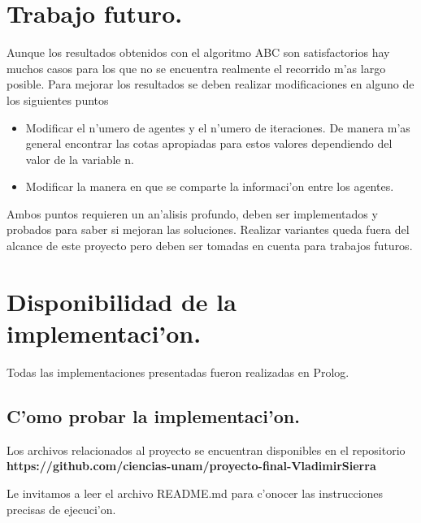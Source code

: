 \documentclass[12pt]{article}
\begin{document}
    \section{Trabajo futuro.}
    Aunque los resultados obtenidos con el algoritmo ABC son satisfactorios
    hay muchos casos para los que no se encuentra realmente el recorrido m'as largo posible.
    Para mejorar los resultados se deben realizar modificaciones en alguno de los siguientes puntos
    \begin{itemize}
        \item Modificar el n'umero de agentes y el n'umero de iteraciones. De manera m'as general
            encontrar las cotas apropiadas para estos
            valores dependiendo del valor de la variable n.
        \item Modificar la manera en que se comparte la informaci'on entre los agentes.
    \end{itemize}

    Ambos puntos requieren un an'alisis profundo, deben ser implementados y probados
    para saber si mejoran las soluciones.
    Realizar variantes queda fuera del alcance de este proyecto pero
    deben ser tomadas en cuenta para trabajos futuros.


    \section{Disponibilidad de la implementaci'on.}

    Todas las implementaciones presentadas fueron realizadas en Prolog.

    \subsection{C'omo probar la implementaci'on.}

    Los archivos relacionados al proyecto se encuentran disponibles
    en el repositorio\\
    \textbf{
    https://github.com/ciencias-unam/proyecto-final-VladimirSierra
    }

    Le invitamos a leer el archivo README.md para
    c'onocer las instrucciones precisas de ejecuci'on.


    \printbibliography
\end{document}
